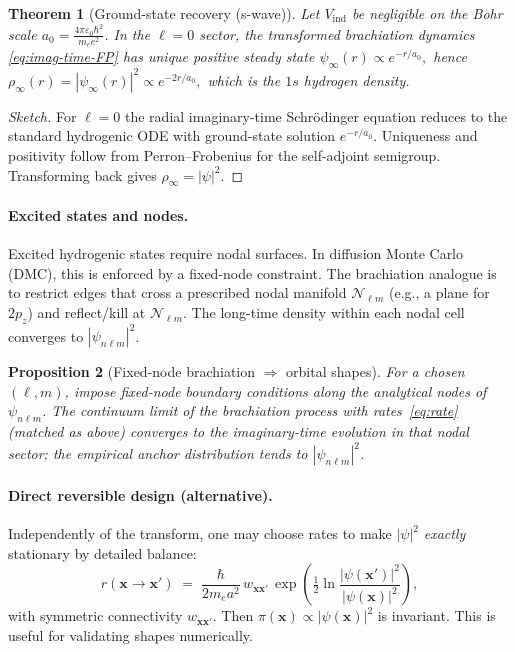 \documentclass[11pt]{article}
\theoremstyle{plain}
\newtheorem{theorem}{Theorem}[section]
\newtheorem{proposition}[theorem]{Proposition}
\theoremstyle{definition}
\begin{document}
\begin{theorem}[Ground-state recovery (s-wave)]
  \label{thm:gs-recovery}
  Let $V_{\mathrm{ind}}$ be negligible on the Bohr scale $a_0=\frac{4\pi\varepsilon_0\hbar^2}{m_e e^2}$. In the $\ell=0$ sector, the transformed brachiation dynamics \eqref{eq:imag-time-FP} has unique positive steady state
  \(
    \psi_\infty(r)\propto e^{-r/a_0},
  \)
  hence
  \(
    \rho_\infty(r) = |\psi_\infty(r)|^2 \propto e^{-2r/a_0},
  \)
  which is the $1s$ hydrogen density.
\end{theorem}

\begin{proof}[Sketch]
  For $\ell=0$ the radial imaginary-time Schrödinger equation reduces to the standard hydrogenic ODE with ground-state solution $e^{-r/a_0}$. Uniqueness and positivity follow from Perron–Frobenius for the self-adjoint semigroup. Transforming back gives $\rho_\infty=|\psi|^2$.
\end{proof}

\paragraph{Excited states and nodes.}
Excited hydrogenic states require nodal surfaces. In diffusion Monte Carlo (DMC), this is enforced by a fixed-node constraint. The brachiation analogue is to restrict edges that cross a prescribed nodal manifold $\mathcal{N}_{\ell m}$ (e.g., a plane for $2p_z$) and reflect/kill at $\mathcal{N}_{\ell m}$. The long-time density within each nodal cell converges to $|\psi_{n\ell m}|^2$.

\begin{proposition}[Fixed-node brachiation $\Rightarrow$ orbital shapes]
  \label{prop:fixed-node}
  For a chosen $(\ell,m)$, impose fixed-node boundary conditions along the analytical nodes of $\psi_{n\ell m}$. The continuum limit of the brachiation process with rates~\eqref{eq:rate} (matched as above) converges to the imaginary-time evolution in that nodal sector; the empirical anchor distribution tends to $|\psi_{n\ell m}|^2$.
\end{proposition}

\paragraph{Direct reversible design (alternative).}
Independently of the transform, one may choose rates to make $|\psi|^2$ \emph{exactly} stationary by detailed balance:
\[
  r(\mathbf{x}\!\to\!\mathbf{x}') \;=\; \frac{\hbar}{2 m_e a^2}\,w_{\mathbf{x}\mathbf{x}'}\,
  \exp\!\left(\tfrac12\ln\frac{|\psi(\mathbf{x}')|^2}{|\psi(\mathbf{x})|^2}\right),
\]
with symmetric connectivity $w_{\mathbf{x}\mathbf{x}'}. $ Then $\pi(\mathbf{x})\propto|\psi(\mathbf{x})|^2$ is invariant. This is useful for validating shapes numerically.
\end{document}
